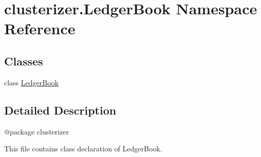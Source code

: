 \hypertarget{namespaceclusterizer_1_1LedgerBook}{}\section{clusterizer.\+Ledger\+Book Namespace Reference}
\label{namespaceclusterizer_1_1LedgerBook}
\subsection*{Classes}
\begin{DoxyCompactItemize}
\item 
class \hyperlink{classclusterizer_1_1LedgerBook_1_1LedgerBook}{Ledger\+Book}
\end{DoxyCompactItemize}


\subsection{Detailed Description}
\begin{DoxyVerb}@package clusterizer

This file contains class declaration of LedgerBook.
\end{DoxyVerb}
 
